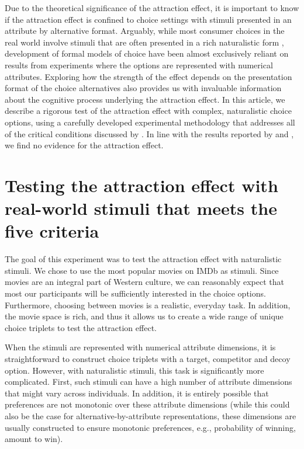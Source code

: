 \documentclass[12pt, a4paper]{article}
\begin{document}
Due to the theoretical significance of the attraction effect, it is important to know if the attraction effect is confined to choice settings with stimuli presented in an attribute by alternative format. Arguably, while most consumer choices in the real world involve stimuli that are often presented in a rich naturalistic form \cite{Bhatia2018b}, development of formal models of choice have been almost exclusively reliant on results from experiments where the options are represented with numerical attributes. Exploring how the strength of the effect depends on the presentation format of the choice alternatives also provides us with invaluable information about the cognitive process underlying the attraction effect. In this article, we describe a rigorous test of the attraction effect with complex, naturalistic choice options, using a carefully developed experimental methodology that addresses all of the critical conditions discussed by . In line with the results reported by  and , we find no evidence for the attraction effect.


\section*{Testing the attraction effect with real-world stimuli that meets the five criteria}

The goal of this experiment was to test the attraction effect with naturalistic stimuli. We chose to use the most popular movies on IMDb as stimuli. Since movies are an integral part of Western culture, we can reasonably expect that most our participants will be sufficiently interested in the choice options. Furthermore, choosing between movies is a realistic, everyday task. In addition, the movie space is rich, and thus it allows us to create a wide range of unique choice triplets to test the attraction effect.

When the stimuli are represented with numerical attribute dimensions, it is straightforward to construct choice triplets with a target, competitor and decoy option. However, with naturalistic stimuli, this task is significantly more complicated. First, such stimuli can have a high number of attribute dimensions that might vary across individuals. In addition, it is entirely possible that preferences are not monotonic over these attribute dimensions (while this could also be the case for alternative-by-attribute representations, these dimensions are usually constructed to ensure monotonic preferences, e.g., probability of winning, amount to win).
\end{document}
